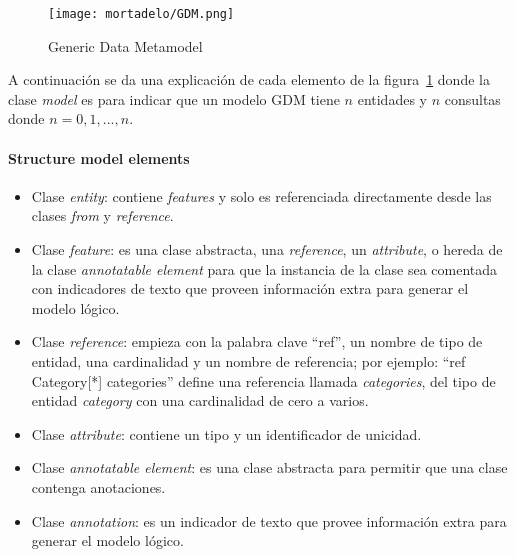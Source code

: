 

\begin{figure}[H] 
    \centering
    \texttt{[image: mortadelo/GDM.png]}
    \caption{Generic Data Metamodel}
    \label{img:mortadelo-gdm}
\end{figure}


A continuación se da una explicación de cada elemento de la figura~\ref{img:mortadelo-gdm} donde la clase \textit{model} es para indicar que un modelo GDM tiene $n$ entidades y $n$ consultas donde $n=0,1,...,n$.


\paragraph*{Structure model elements}


\begin{itemize}    
    
    \item Clase \textit{entity}: contiene \textit{features} y solo es referenciada directamente desde las clases \textit{from} y \textit{reference}.
    \item Clase \textit{feature}: es una clase abstracta, una \textit{reference}, un \textit{attribute}, o hereda de la clase \textit{annotatable element} para que la instancia de la clase sea comentada con indicadores de texto que proveen información extra para generar el modelo lógico. 
    \item Clase \textit{reference}: empieza con la palabra clave ``ref'', un nombre de tipo de entidad, una cardinalidad y un nombre de referencia; por ejemplo: ``ref Category[*] categories'' define una referencia llamada \textit{categories}, del tipo de entidad \textit{category} con una cardinalidad de cero a varios.
    \item Clase \textit{attribute}: contiene un tipo y un identificador de unicidad.
    \item Clase \textit{annotatable element}: es una clase abstracta para permitir que una clase contenga anotaciones.
    \item Clase \textit{annotation}: es un indicador de texto que provee información extra para generar el modelo lógico.
    
\end{itemize}

